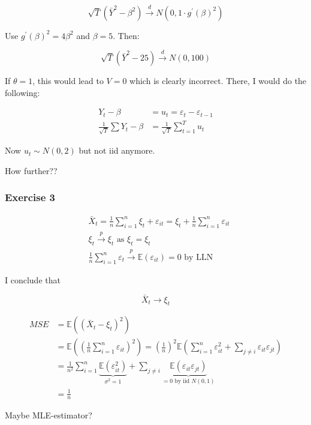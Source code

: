 {{\begin{enumerate}[label=(\alph*)]
{$$
\sqrt{T}\left(\bar{Y}^{2}-\beta^{2}\right) \xrightarrow{d} N\left(0,1 \cdot g^{\prime}(\beta)^{2}\right)
$$

Use $g^{\prime}(\beta)^{2}=4 \beta^{2}$ and $\beta=5$. Then:

$$
\sqrt{T}\left(\bar{Y}^{2}-25\right) \xrightarrow{d} N\left(0,100\right)
$$
}
{\item 
If $\theta=1$, this would lead to $V=0$ which is clearly incorrect. There, I would do the following:

$$
\begin{aligned}
Y_{t}-\beta & =u_{t}=\varepsilon_{t}-\varepsilon_{t-1} \\
\frac{1}{\sqrt{T}} \sum Y_{t}-\beta & =\frac{1}{\sqrt{T}} \sum_{t=1}^{T} u_{t}
\end{aligned}
$$

Now $u_{t} \sim N(0,2)$ but not iid anymore.

\color{red} How further?? \color{black}
}
\end{enumerate}
}
{
\subsubsection*{Exercise 3}

\begin{enumerate}[label=(\alph*)]
{\item 
$$
\begin{aligned}
& \bar{X}_{t}=\frac{1}{n} \sum_{i=1}^{n} \xi_{t}+\varepsilon_{i t}=\xi_{t}+\frac{1}{n} \sum_{i=1}^{n} \varepsilon_{i t} \\
& \xi_{t} \xrightarrow{p} \xi_{t} \text { as } \xi_{t}=\xi_{t} \\
& \frac{1}{n} \sum_{i=1}^{n} \varepsilon_{t} \xrightarrow{p} \mathbb{E}\left(\varepsilon_{i t}\right)=0 \text { by LLN}
\end{aligned}
$$

I conclude that

$$
\bar{X}_{t} \longrightarrow \xi_{t}
$$
}
{\item 
$$
\begin{aligned}
M S E & =\mathbb{E}\left(\left(\bar{X}_{t}-\xi_{t}\right)^{2}\right) \\
& =\mathbb{E}\left(\left(\frac{1}{n} \sum_{i=1}^n \varepsilon_{i t}\right)^{2}\right)=\left(\frac{1}{n}\right)^{2} \mathbb{E}\left(\sum_{i=1}^{n} \varepsilon_{i t}^{2}+\sum_{j \neq i} \varepsilon_{i t} \varepsilon_{j t}\right) \\
& =\frac{1}{n^{2}} \sum_{i=1}^{n} \underbrace{\mathbb{E}\left(\varepsilon_{it}^{2}\right)}_{\sigma^{2}=1}+\sum_{j \neq i} \underbrace{\mathbb{E}\left(\varepsilon_{i t} \varepsilon_{j t}\right)}_{=0 \text { by iid } N(0,1)} \\
& =\frac{1}{n}
\end{aligned}
$$
}
{\item 
\color{red} Maybe MLE-estimator? \color{black}
}
\end{enumerate}
}
}

